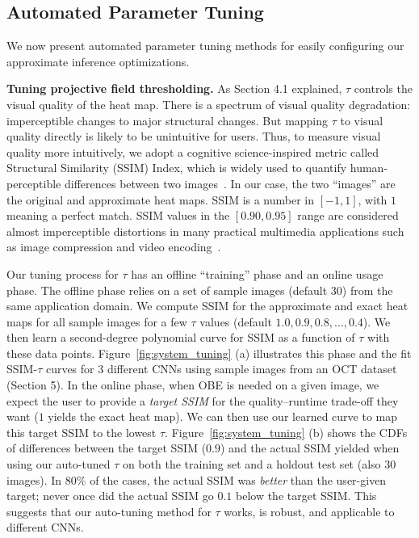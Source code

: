 \subsection{Automated Parameter Tuning}
We now present automated parameter tuning methods for easily configuring our approximate inference optimizations.

\vspace{2mm}
\noindent \textbf{Tuning projective field thresholding.}
As Section 4.1 explained, $\tau$ controls the visual quality of the heat map. There is a spectrum of visual quality degradation: imperceptible changes to major structural changes. But mapping $\tau$ to visual quality directly is likely to be unintuitive for users. Thus, to measure visual quality more intuitively, we adopt a cognitive science-inspired metric called Structural Similarity (SSIM) Index, which is widely used to quantify human-perceptible differences between two images~\cite{wang2004image}. In our case, the two ``images'' are the original and approximate heat maps. SSIM is a number in $[-1,1]$, with $1$ meaning a perfect match. SSIM values in the $[0.90,0.95]$ range are considered almost imperceptible distortions in many practical multimedia applications such as image compression and video encoding~\cite{wang2004image}.

Our tuning process for $\tau$ has an offline ``training'' phase and an online usage phase. The offline phase relies on a set of sample images (default $30$) from the same application domain. We compute SSIM for the approximate and exact heat maps for all sample images for a few $\tau$ values (default $1.0, 0.9, 0.8, \dots, 0.4$). We then learn a second-degree polynomial curve for SSIM as a function of $\tau$ with these data points. Figure~\ref{fig:system_tuning} (a) illustrates this phase and the fit SSIM-$\tau$ curves for 3 different CNNs using sample images from an OCT dataset (Section 5). In the online phase, when OBE is needed on a given image, we expect the user to provide a \textit{target SSIM} for the quality--runtime trade-off they want ($1$ yields the exact heat map). We can then use our learned curve to map this target SSIM to the lowest $\tau$. Figure~\ref{fig:system_tuning} (b) shows the CDFs of differences between the target SSIM ($0.9$) and the actual SSIM yielded when using our auto-tuned $\tau$ on both the training set and a holdout test set (also $30$ images). In $80\%$ of the cases, the actual SSIM was \textit{better} than the user-given target; never once did the actual SSIM go $0.1$ below the target SSIM. This suggests that our auto-tuning method for $\tau$ works, is robust, and applicable to different CNNs.

